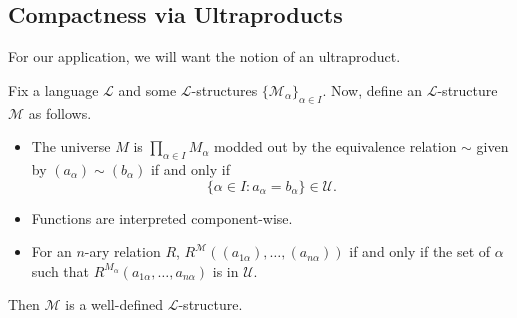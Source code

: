 \documentclass[../notes.tex]{subfiles}
\begin{document}
\subsection{Compactness via Ultraproducts}
For our application, we will want the notion of an ultraproduct.
\begin{lemma} \label{lem:ultraprod}
	Fix a language $\mathcal L$ and some $\mathcal L$-structures $\{\mathcal M_\alpha\}_{\alpha\in I}$. Now, define an $\mathcal L$-structure $\mathcal M$ as follows.
	\begin{itemize}
		\item The universe $M$ is $\prod_{\alpha\in I}M_\alpha$ modded out by the equivalence relation $\sim$ given by $(a_\alpha)\sim(b_\alpha)$ if and only if
		\[\{\alpha\in I:a_\alpha=b_\alpha\}\in\mathcal U.\]
		\item Functions are interpreted component-wise.
		\item For an $n$-ary relation $R$, $R^\mathcal M((a_{1\alpha}),\ldots,(a_{n\alpha}))$ if and only if the set of $\alpha$ such that $R^{M_\alpha}(a_{1\alpha},\ldots,a_{n\alpha})$ is in $\mathcal U$.
	\end{itemize}
	Then $\mathcal M$ is a well-defined $\mathcal L$-structure.
\end{lemma}
\end{document}
